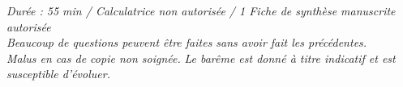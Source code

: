 \documentclass[noCustomPackages, basic,ds]{UPSTI_Document}
\newif\ifavecEspaceReponse
\newcommand{\cartoucheNom}{%
  \ifavecEspaceReponse
    \noindent\fbox{%
      \begin{minipage}{.95\linewidth}
        Nom, prénom et groupe :
        \vspace*{.5cm}\dotfill
        \vspace*{1mm}
      \end{minipage}%
    }%
    \vspace{1em}%
  \fi
}
\begin{document}
\cartoucheNom

\begin{center}
    \textit{Durée : 55 min / Calculatrice non autorisée / 1 Fiche de synthèse manuscrite autorisée}\\
    \textit{Beaucoup de questions peuvent être faites sans avoir fait les précédentes.}\\
    \textit{Malus en cas de copie non soignée.}
    \textit{Le barême est donné à titre indicatif et est susceptible d'évoluer.}
\end{center}

\vspace{1em}






\end{document}
